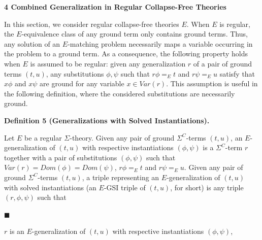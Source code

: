  
 
 


 
\par\medskip\noindent\textbf{4 Combined Generalization in Regular Collapse-Free Theories}\par
 
 
In this section, we consider regular collapse-free theories $E$. When $E$ is regular, the $E$-equivalence class of any ground term only contains ground terms. Thus, any solution of an $E$-matching problem necessarily maps a variable occurring in the problem to a ground term. As a consequence, the following property holds when $E$ is assumed to be regular: given any generalization $r$ of a pair of ground terms $(t,u)$, any substitutions $\phi,\psi$ such that $r\phi=_{E}t$ and $r\psi=_{E}u$ satisfy that $x\phi$ and $x\psi$ are ground for any variable $x\in\mathit{Var}(r)$. This assumption is useful in the following definition, where the considered substitutions are necessarily ground.\par
 
 
 
\par\medskip\noindent\textbf{Definition 5 (Generalizations with Solved Instantiations).}\par
 
 
Let $E$ be a regular $\Sigma$-theory. Given any pair of ground ${\Sigma}^{C}$-terms $(t,u)$, an $E$-generalization of $(t,u)$ with respective instantiations $(\phi,\psi)$ is a ${\Sigma}^{C}$-term $r$ together with a pair of substitutions $(\phi,\psi)$ such that $\mathit{Var}(r)=\mathit{Dom}(\phi)=\mathit{Dom}(\psi)$, $r\phi=_{E}t$ and $r\psi=_{E}u$. Given any pair of ground ${\Sigma}^{C}$-terms $(t,u)$, a triple representing an $E$-generalization of $(t,u)$ with solved instantiations (an $E$-GSI triple of $(t,u)$, for short) is any triple $(r,\phi,\psi)$ such that\par
  
\par\noindent  $\blacksquare$ 
 
$r$ is an $E$-generalization of $(t,u)$ with respective instantiations $(\phi,\psi)$,\par
 
